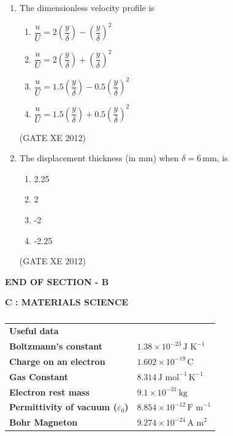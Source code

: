 \documentclass[12pt]{article}
\begin{document}
\begin{enumerate}
\item The dimensionless velocity profile is
\begin{multicols}{2}
\begin{enumerate}
\item $\dfrac{u}{U} = 2\left(\dfrac{y}{\delta}\right) - \left(\dfrac{y}{\delta}\right)^2$
\item $\dfrac{u}{U} = 2\left(\dfrac{y}{\delta}\right) + \left(\dfrac{y}{\delta}\right)^2$
\item $\dfrac{u}{U} = 1.5\left(\dfrac{y}{\delta}\right) - 0.5\left(\dfrac{y}{\delta}\right)^2$
\item $\dfrac{u}{U} = 1.5\left(\dfrac{y}{\delta}\right) + 0.5\left(\dfrac{y}{\delta}\right)^2$
\end{enumerate}
\end{multicols}

(GATE XE 2012)

\item The displacement thickness (in mm) when $\delta = 6 \,\text{mm}$, is
\begin{multicols}{4}
\begin{enumerate}
\item 2.25
\item 2
\item -2
\item -2.25
\end{enumerate}
\end{multicols}

(GATE XE 2012)

\end{enumerate}

\begin{center}
\textbf{END OF SECTION - B}
\end{center}

\newpage

\begin{center}
{\Large \textbf{C : MATERIALS SCIENCE}}
\end{center}

\begin{table}[H]
\centering
\begin{tabular}{>{\bfseries}l l}
Useful data &  \\
Boltzmann’s constant & $1.38 \times 10^{-23}\,\text{J K}^{-1}$ \\
Charge on an electron & $1.602 \times 10^{-19}\,\text{C}$ \\
Gas Constant & $8.314 \,\text{J mol}^{-1}\,\text{K}^{-1}$ \\
Electron rest mass & $9.1 \times 10^{-31}\,\text{kg}$ \\
Permittivity of vacuum ($\varepsilon_0$) & $8.854 \times 10^{-12}\,\text{F m}^{-1}$ \\
Bohr Magneton & $9.274 \times 10^{-24}\,\text{A m}^2$ \\
\end{tabular}
\caption{}
\label{}
\end{table}
\end{document}
